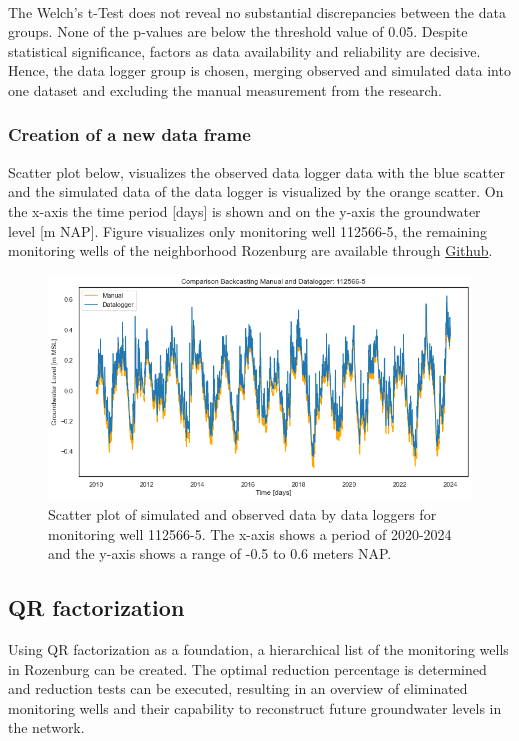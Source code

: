 \\
\noindent
The Welch's t-Test does not reveal no substantial discrepancies between the data groups. None of the p-values are below the threshold value of 0.05. Despite statistical significance, factors as data availability and reliability are decisive. Hence, the data logger group is chosen, merging observed and simulated data into one dataset and excluding the manual measurement from the research. 

\subsubsection{Creation of a new data frame}
Scatter plot  below, visualizes the observed data logger data with the blue scatter and the simulated data of the data logger is visualized by the orange scatter. On the x-axis the time period [days] is shown and on the y-axis the groundwater level [m NAP]. Figure  visualizes only monitoring well 112566-5, the remaining monitoring wells of the neighborhood Rozenburg are available through \href{https://github.com/hannahwillemijn9/GWMNO-Rotterdam.git}{Github}.

\begin{figure}[htbp]
    \centering
    \includegraphics[width=0.80\linewidth]{frontmatter/Rozenburg-fig/Figure 2024-03-12 093200 (238).png}
    \caption{Scatter plot of simulated and observed data by data loggers for monitoring well 112566-5. The x-axis shows a period of 2020-2024 and the y-axis shows a range of -0.5 to 0.6 meters NAP. }
    \label{scatter}
\end{figure}
\newpage
\subsection{QR factorization}
Using QR factorization as a foundation, a hierarchical list of the monitoring wells in Rozenburg can be created. The optimal reduction percentage is determined and reduction tests can be executed, resulting in an overview of eliminated monitoring wells and their capability to reconstruct future groundwater levels in the network.

